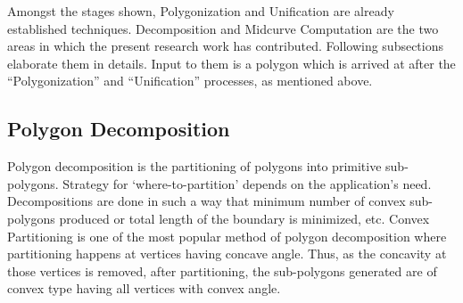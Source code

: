 Amongst the stages shown, Polygonization and Unification are already established techniques. Decomposition and Midcurve Computation are the two areas in which the present research work has contributed. Following subsections elaborate them in details. Input to them is a polygon which is arrived at after the ``Polygonization'' and ``Unification'' processes, as mentioned above. %

%


\subsection{Polygon Decomposition}

Polygon decomposition is the partitioning of polygons into primitive sub-polygons. 
Strategy for `where-to-partition' depends on the application's need. Decompositions are done in such a way that minimum number of convex sub-polygons produced or total length of the boundary is minimized, etc. Convex Partitioning is one of the most popular method of polygon decomposition where partitioning happens at vertices having concave angle. Thus, as the concavity at those vertices is removed, after partitioning, the sub-polygons generated are of convex type having all vertices with convex angle. 

